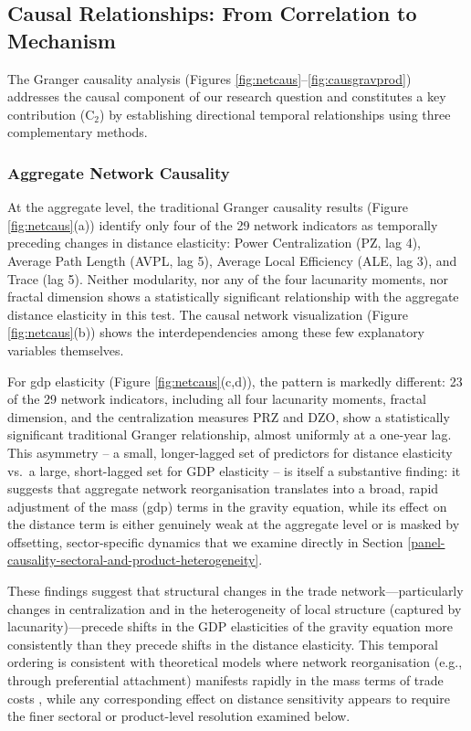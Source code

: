 \documentclass[preprint, 3p,
authoryear]{elsarticle} %
\begin{document}
\subsection{Causal Relationships: From Correlation to
Mechanism}\label{subsec:causality}

The Granger causality analysis (Figures
\ref{fig:netcaus}--\ref{fig:causgravprod}) addresses the causal
component of our research question and constitutes a key contribution
(C\(_2\)) by establishing directional temporal relationships using three
complementary methods.

\subsubsection{Aggregate Network
Causality}\label{aggregate-network-causality}

At the aggregate level, the traditional Granger causality results
(Figure \ref{fig:netcaus}(a)) identify only four of the 29 network
indicators as temporally preceding changes in distance elasticity: Power
Centralization (PZ, lag 4), Average Path Length (AVPL, lag 5), Average
Local Efficiency (ALE, lag 3), and Trace (lag 5). Neither modularity,
nor any of the four lacunarity moments, nor fractal dimension shows a
statistically significant relationship with the aggregate distance
elasticity in this test. The causal network visualization (Figure
\ref{fig:netcaus}(b)) shows the interdependencies among these few
explanatory variables themselves.

For \gls{gdp} elasticity (Figure \ref{fig:netcaus}(c,d)), the pattern is
markedly different: 23 of the 29 network indicators, including all four
lacunarity moments, fractal dimension, and the centralization measures
PRZ and DZO, show a statistically significant traditional Granger
relationship, almost uniformly at a one-year lag. This asymmetry -- a
small, longer-lagged set of predictors for distance elasticity vs.~a
large, short-lagged set for GDP elasticity -- is itself a substantive
finding: it suggests that aggregate network reorganisation translates
into a broad, rapid adjustment of the mass (\gls{gdp}) terms in the
gravity equation, while its effect on the distance term is either
genuinely weak at the aggregate level or is masked by offsetting,
sector-specific dynamics that we examine directly in Section
\ref{panel-causality-sectoral-and-product-heterogeneity}.

These findings suggest that structural changes in the trade
network---particularly changes in centralization and in the
heterogeneity of local structure (captured by lacunarity)---precede
shifts in the GDP elasticities of the gravity equation more consistently
than they precede shifts in the distance elasticity. This temporal
ordering is consistent with theoretical models where network
reorganisation (e.g., through preferential attachment) manifests rapidly
in the mass terms of trade costs \citep{chaney2014}, while any
corresponding effect on distance sensitivity appears to require the
finer sectoral or product-level resolution examined below.
\end{document}

